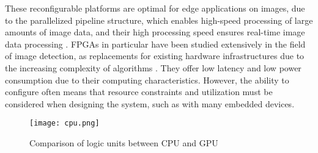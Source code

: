 These reconfigurable platforms are optimal for edge applications on images, due to the parallelized pipeline structure, which enables high-speed processing of large amounts of image data, and their high processing speed ensures real-time image data processing \cite{Video}. FPGAs in particular have been studied extensively in the field of image detection, as replacements for existing hardware infrastructures due to the increasing complexity of algorithms \cite{ResearchFPGA}. They offer low latency and low power consumption due to their computing characteristics. However, the ability to configure often means that resource constraints and utilization must be considered when designing the system, such as with many embedded devices.

\begin{figure}[h]
    \centering
    \texttt{[image: cpu.png]}
    \caption{Comparison of logic units between CPU and GPU \cite{21}}
    \label{fig:cpu_gpu}
\end{figure}